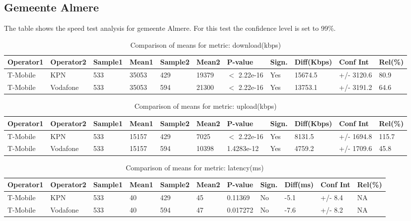 \documentclass[]{article}
\begin{document}
\normalsize

\newpage

\subsection{Gemeente Almere}\label{gemeente-almere}

The table shows the speed test analysis for gemeente Almere. For this
test the confidence level is set to 99\%.

\begin{table}[ht]
\centering
{\footnotesize
\begin{tabular}{lllllllllll}
  \hline
Operator1 & Operator2 & Sample1 & Mean1 & Sample2 & Mean2 & P-value & Sign. & Diff(Kbps) & Conf Int & Rel(\%) \\ 
  \hline
T-Mobile & KPN & 533 & 35053 & 429 & 19379 & $<$ 2.22e-16 & Yes & 15674.5 & +/- 3120.6 & 80.9 \\ 
  T-Mobile & Vodafone & 533 & 35053 & 594 & 21300 & $<$ 2.22e-16 & Yes & 13753.1 & +/- 3191.2 & 64.6 \\ 
   \hline
\end{tabular}
}
\caption{Comparison of means for metric: download(kbps)} 
\end{table}

\begin{table}[ht]
\centering
{\footnotesize
\begin{tabular}{lllllllllll}
  \hline
Operator1 & Operator2 & Sample1 & Mean1 & Sample2 & Mean2 & P-value & Sign. & Diff(Kbps) & Conf Int & Rel(\%) \\ 
  \hline
T-Mobile & KPN & 533 & 15157 & 429 & 7025 & $<$ 2.22e-16 & Yes & 8131.5 & +/- 1694.8 & 115.7 \\ 
  T-Mobile & Vodafone & 533 & 15157 & 594 & 10398 & 1.4283e-12 & Yes & 4759.2 & +/- 1709.6 & 45.8 \\ 
   \hline
\end{tabular}
}
\caption{Comparison of means for metric: upload(kbps)} 
\end{table}

\begin{table}[ht]
\centering
{\footnotesize
\begin{tabular}{lllllllllll}
  \hline
Operator1 & Operator2 & Sample1 & Mean1 & Sample2 & Mean2 & P-value & Sign. & Diff(ms) & Conf Int & Rel(\%) \\ 
  \hline
T-Mobile & KPN & 533 & 40 & 429 & 45 & 0.11369 & No & -5.1 & +/- 8.4 & NA \\ 
  T-Mobile & Vodafone & 533 & 40 & 594 & 47 & 0.017272 & No & -7.6 & +/- 8.2 & NA \\ 
   \hline
\end{tabular}
}
\caption{Comparison of means for metric: latency(ms)} 
\end{table}
\end{document}
